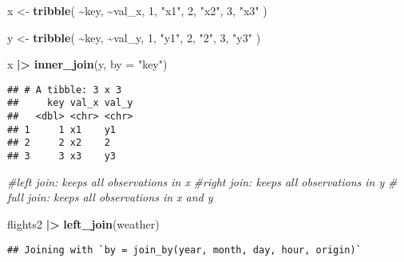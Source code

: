 \documentclass[
]{article}
\newenvironment{Shaded}{\begin{snugshade}}{\end{snugshade}}
\newcommand{\AttributeTok}[1]{\textcolor[rgb]{0.13,0.29,0.53}{#1}}
\newcommand{\CommentTok}[1]{\textcolor[rgb]{0.56,0.35,0.01}{\textit{#1}}}
\newcommand{\DecValTok}[1]{\textcolor[rgb]{0.00,0.00,0.81}{#1}}
\newcommand{\FunctionTok}[1]{\textcolor[rgb]{0.13,0.29,0.53}{\textbf{#1}}}
\newcommand{\NormalTok}[1]{#1}
\newcommand{\OtherTok}[1]{\textcolor[rgb]{0.56,0.35,0.01}{#1}}
\newcommand{\SpecialCharTok}[1]{\textcolor[rgb]{0.81,0.36,0.00}{\textbf{#1}}}
\newcommand{\StringTok}[1]{\textcolor[rgb]{0.31,0.60,0.02}{#1}}
\begin{document}
\begin{Shaded}
\begin{Highlighting}[]
\NormalTok{x }\OtherTok{\textless{}{-}} \FunctionTok{tribble}\NormalTok{(}
  \SpecialCharTok{\textasciitilde{}}\NormalTok{key, }\SpecialCharTok{\textasciitilde{}}\NormalTok{val\_x,}
  \DecValTok{1}\NormalTok{, }\StringTok{"x1"}\NormalTok{,}
  \DecValTok{2}\NormalTok{, }\StringTok{"x2"}\NormalTok{,}
  \DecValTok{3}\NormalTok{, }\StringTok{"x3"}
\NormalTok{)}

\NormalTok{y }\OtherTok{\textless{}{-}} \FunctionTok{tribble}\NormalTok{(}
  \SpecialCharTok{\textasciitilde{}}\NormalTok{key, }\SpecialCharTok{\textasciitilde{}}\NormalTok{val\_y,}
  \DecValTok{1}\NormalTok{, }\StringTok{"y1"}\NormalTok{,}
  \DecValTok{2}\NormalTok{, }\StringTok{"2"}\NormalTok{,}
  \DecValTok{3}\NormalTok{, }\StringTok{"y3"}
\NormalTok{)}


\NormalTok{x }\SpecialCharTok{|\textgreater{}}
  \FunctionTok{inner\_join}\NormalTok{(y, }\AttributeTok{by =} \StringTok{"key"}\NormalTok{)}
\end{Highlighting}
\end{Shaded}

\begin{verbatim}
## # A tibble: 3 x 3
##     key val_x val_y
##   <dbl> <chr> <chr>
## 1     1 x1    y1   
## 2     2 x2    2    
## 3     3 x3    y3
\end{verbatim}

\begin{Shaded}
\begin{Highlighting}[]
\CommentTok{\#left join: keeps all observations in x}
\CommentTok{\#right join: keeps all observations in y}
\CommentTok{\# full join: keeps all observations in x and y}
\end{Highlighting}
\end{Shaded}

\begin{Shaded}
\begin{Highlighting}[]
\NormalTok{flights2 }\SpecialCharTok{|\textgreater{}}
  \FunctionTok{left\_join}\NormalTok{(weather)}
\end{Highlighting}
\end{Shaded}

\begin{verbatim}
## Joining with `by = join_by(year, month, day, hour, origin)`
\end{verbatim}
\end{document}
